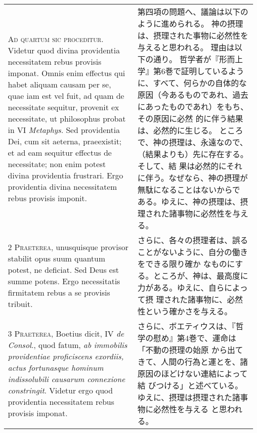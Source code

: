 \documentclass[10pt]{jsarticle} %
\begin{document}
\begin{longtable}{p{21em}p{21em}}


{\Huge A}{\scshape d quartum sic proceditur}. Videtur quod
divina providentia necessitatem rebus provisis imponat. Omnis enim
effectus qui habet aliquam causam per se, quae iam est vel fuit, ad quam
de necessitate sequitur, provenit ex necessitate, ut philosophus probat
in VI {\itshape Metaphys}. Sed providentia Dei, cum sit aeterna, praeexistit; et ad
eam sequitur effectus de necessitate; non enim potest divina providentia
frustrari. Ergo providentia divina necessitatem rebus provisis imponit.

&

第四項の問題へ、議論は以下のように進められる。
神の摂理は、摂理された事物に必然性を与えると思われる。
理由は以下の通り。
哲学者が『形而上学』第6巻で証明しているように、すべて、何らかの自体的な
 原因（今あるものであれ、過去にあったものであれ）をもち、その原因に必然
 的に伴う結果は、必然的に生じる。
ところで、神の摂理は、永遠なので、（結果よりも）先に存在する。そして、結
 果は必然的にそれに伴う。なぜなら、神の摂理が無駄になることはないからで
 ある。ゆえに、神の摂理は、摂理された諸事物に必然性を与える。


\\


2 {\scshape Praeterea}, unusquisque provisor stabilit
opus suum quantum potest, ne deficiat. Sed Deus est summe potens. Ergo
necessitatis firmitatem rebus a se provisis tribuit.

&

さらに、各々の摂理者は、誤ることがないように、自分の働きをできる限り確か
 なものにする。ところが、神は、最高度に力がある。ゆえに、自らによって摂
 理された諸事物に、必然性という確かさを与える。


\\


3 {\scshape Praeterea}, Boetius dicit, IV {\itshape de Consol}.,
quod fatum, {\itshape ab immobilis providentiae proficiscens exordiis, actus
fortunasque hominum indissolubili causarum connexione
constringit}. Videtur ergo quod providentia necessitatem rebus provisis
imponat.

&

さらに、ボエティウスは、『哲学の慰め』第4巻で、運命は「不動の摂理の始原
 から出てきて、人間の行為と運とを、諸原因のほどけない連結によって結
 びつける」と述べている。ゆえに、摂理は摂理された諸事物に必然性を与える
 と思われる。

\\



\end{longtable}
\end{document}
